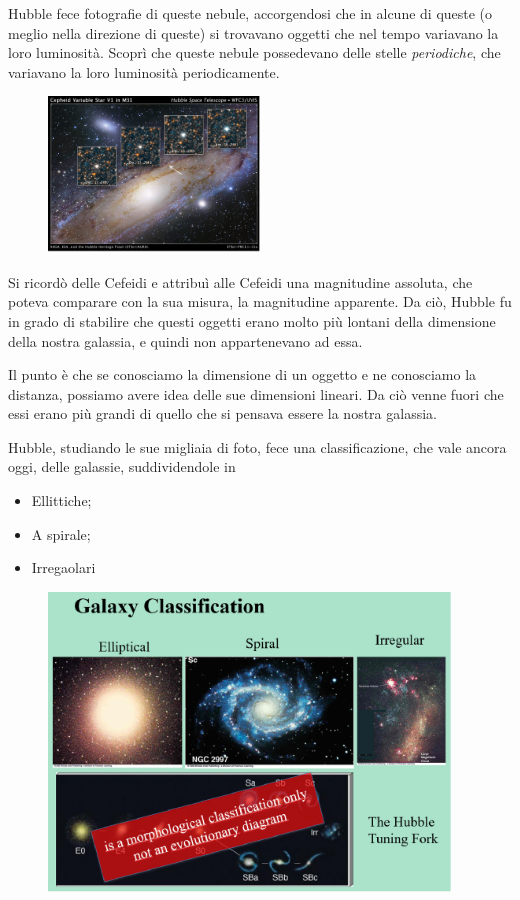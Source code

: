 Hubble fece fotografie di queste nebule, accorgendosi che in alcune di queste (o meglio nella direzione di queste) si trovavano oggetti che nel tempo variavano la loro luminosità. Scoprì che queste nebule possedevano delle stelle \textit{periodiche}, che variavano la loro luminosità periodicamente.

\begin{figure}[H]
    \centering
    \includegraphics[width=0.5\textwidth]{immagini_lezioni12-12/stelle variabili.png}
\end{figure}

Si ricordò delle Cefeidi e attribuì alle Cefeidi una magnitudine assoluta, che poteva comparare con la sua misura, la magnitudine apparente. Da ciò, Hubble fu in grado di stabilire che questi oggetti erano molto più lontani della dimensione della nostra galassia, e quindi non appartenevano ad essa.

Il punto è che se conosciamo la dimensione di un oggetto e ne conosciamo la distanza, possiamo avere idea delle sue dimensioni lineari. Da ciò venne fuori che essi erano più grandi di quello che si pensava essere la nostra galassia.

Hubble, studiando le sue migliaia di foto, fece una classificazione, che vale ancora oggi, delle galassie, suddividendole in

\begin{itemize}
    \item Ellittiche;
    \item A spirale;
    \item Irregaolari
\end{itemize}

\begin{figure}[H]
    \centering
    \includegraphics[width=0.95\textwidth]{immagini_lezioni12-12/classificazione galassie.png}
    \label{}
\end{figure}

